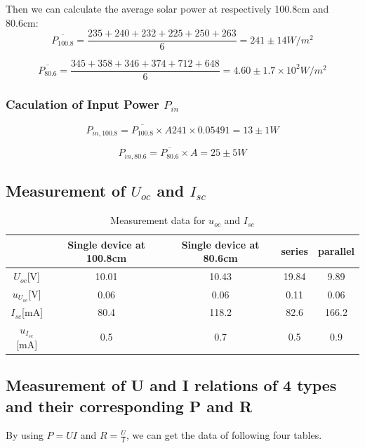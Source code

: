 \documentclass[12pt,a4paper]{article}
\begin{document}
Then we can calculate the average solar power at respectively 100.8cm and 80.6cm:
\begin{equation*}
    \overline{P_{100.8}}=\frac{235+240+232+225+250+263}{6}=241\pm14W/m^2
\end{equation*}

\begin{equation*}
    \overline{P_{80.6}}=\frac{345+358+346+374+712+648}{6}=4.60\pm1.7\times 10^2 W/m^2
\end{equation*}

\subsubsection{Caculation of Input Power $P_{in}$}
\begin{equation*}
    P_{in,100.8}=\overline{P_{100.8}}\times A241\times0.05491=13\pm1W
\end{equation*}

\begin{equation*}
    P_{in,80.6}=\overline{P_{80.6}}\times A=25\pm 5 W
\end{equation*}

\subsection{Measurement of $U_{oc}$ and $I_{sc}$}
\begin{table}[H]
    \centering
    \begin{tabular}{|c|c|c|c|c|}
    \hline
       & Single device at 100.8cm & Single device at 80.6cm & series & parallel \\ \hline
    $U_{oc}$[V]  & 10.01  & 10.43 & 19.84  & 9.89  \\ \hline
    $u_{U_{oc}}$[V] & 0.06 & 0.06  & 0.11  & 0.06 \\ \hline
    $I_{sc}$[mA]  & 80.4 & 118.2 & 82.6 & 166.2  \\ \hline
    $u_{I_{sc}}$[mA] & 0.5 & 0.7 & 0.5  & 0.9 \\ \hline
    \end{tabular}
    \caption{Measurement data for $u_{oc}$ and $I_{sc}$}
\end{table}

\subsection{ Measurement of U and I relations of 4 types and their corresponding P and R}
By using $P=UI$ and $R=\frac{U}{I}$, we can get the data of following four tables.
\end{document}
